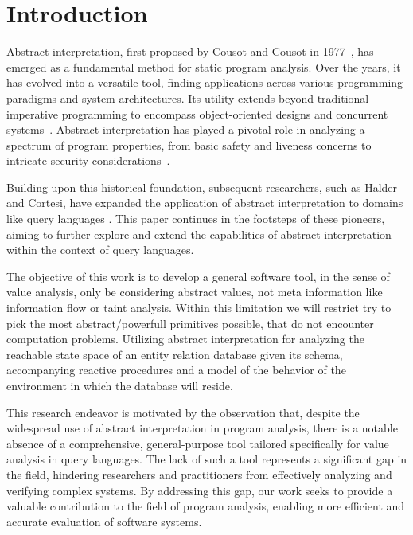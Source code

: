 
\section{Introduction}\label{sec:introduction}
Abstract interpretation, first proposed by Cousot and Cousot in 1977~\cite{cousot1977abstract}, has emerged as a fundamental method for static program analysis.
Over the years, it has evolved into a versatile tool, finding applications across various programming paradigms and system architectures.
Its utility extends beyond traditional imperative programming to encompass object-oriented designs and concurrent systems~\cite{gustafsson_analyzing_2013, mine_static_2023}.
Abstract interpretation has played a pivotal role in analyzing a spectrum of program properties, from basic safety and liveness concerns to intricate security considerations~\cite{mastroeni_abstract_2011}.


Building upon this historical foundation, subsequent researchers, such as Halder and Cortesi, have expanded the application of abstract interpretation to domains like query languages \cite{halder_abstract_2012}.
This paper continues in the footsteps of these pioneers, aiming to further explore and extend the capabilities of abstract interpretation within the context of query languages.

The objective of this work is to develop a general software tool, in the sense of value analysis, only be considering abstract values, not meta information like information flow or taint analysis.
Within this limitation we will restrict try to pick the most abstract/powerfull primitives possible, that do not encounter computation problems.
Utilizing abstract interpretation for analyzing the reachable state space of an entity relation database given its schema, accompanying reactive procedures and a model of the behavior of the environment in which the database will reside.



This research endeavor is motivated by the observation that, despite the widespread use of abstract interpretation in program analysis, there is a notable absence of a comprehensive, general-purpose tool tailored specifically for value analysis in query languages.
The lack of such a tool represents a significant gap in the field, hindering researchers and practitioners from effectively analyzing and verifying complex systems.
By addressing this gap, our work seeks to provide a valuable contribution to the field of program analysis, enabling more efficient and accurate evaluation of software systems.
